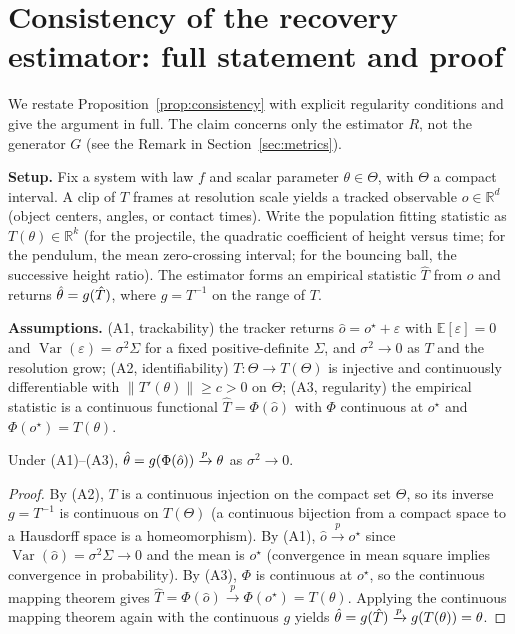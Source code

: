 \section{Consistency of the recovery estimator: full statement and proof}
\label{app:proof}
We restate Proposition~\ref{prop:consistency} with explicit regularity
conditions and give the argument in full. The claim concerns only the estimator
$R$, not the generator $G$ (see the Remark in Section~\ref{sec:metrics}).

\textbf{Setup.} Fix a system with law $f$ and scalar parameter
$\theta\in\Theta$, with $\Theta$ a compact interval. A clip of $T$ frames at
resolution scale yields a tracked observable $o\in\mathbb{R}^{d}$ (object
centers, angles, or contact times). Write the population fitting statistic as
$T(\theta)\in\mathbb{R}^{k}$ (for the projectile, the quadratic coefficient of
height versus time; for the pendulum, the mean zero-crossing interval; for the
bouncing ball, the successive height ratio). The estimator forms an empirical
statistic $\hat T$ from $o$ and returns $\hat{\theta}=g(\hat T)$, where
$g=T^{-1}$ on the range of $T$.

\textbf{Assumptions.} (A1, trackability) the tracker returns
$\hat o = o^\star + \varepsilon$ with $\mathbb{E}[\varepsilon]=0$ and
$\operatorname{Var}(\varepsilon)=\sigma^2 \Sigma$ for a fixed positive-definite
$\Sigma$, and $\sigma^2\to 0$ as $T$ and the resolution grow; (A2,
identifiability) $T:\Theta\to T(\Theta)$ is injective and continuously
differentiable with $\|T'(\theta)\|\ge c>0$ on $\Theta$; (A3, regularity) the
empirical statistic is a continuous functional $\hat T=\Phi(\hat o)$ with $\Phi$
continuous at $o^\star$ and $\Phi(o^\star)=T(\theta)$.

\begin{proposition}
Under (A1)--(A3), $\hat{\theta}=g(\Phi(\hat o)) \xrightarrow{p} \theta$ as
$\sigma^2\to 0$.
\end{proposition}

\begin{proof}
By (A2), $T$ is a continuous injection on the compact set $\Theta$, so its
inverse $g=T^{-1}$ is continuous on $T(\Theta)$ (a continuous bijection from a
compact space to a Hausdorff space is a homeomorphism). By (A1),
$\hat o \xrightarrow{p} o^\star$ since $\operatorname{Var}(\hat o)=\sigma^2\Sigma
\to 0$ and the mean is $o^\star$ (convergence in mean square implies
convergence in probability). By (A3), $\Phi$ is continuous at $o^\star$, so the
continuous mapping theorem gives $\hat T=\Phi(\hat o)\xrightarrow{p}
\Phi(o^\star)=T(\theta)$. Applying the continuous mapping theorem again with the
continuous $g$ yields $\hat{\theta}=g(\hat T)\xrightarrow{p} g(T(\theta))=\theta$.
\end{proof}

